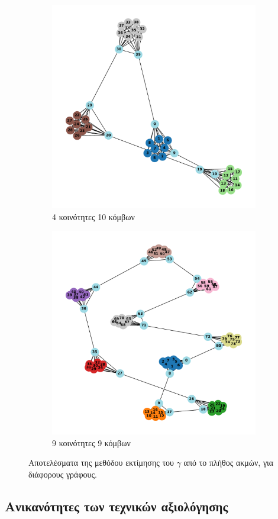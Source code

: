\documentclass[12pt, letterpaper]{article}
\begin{document}
\begin{figure}
  \begin{subfigure}{0.5\textwidth}
    \centering
    \includegraphics[width=0.6\linewidth]{AUTO4,10.pdf}
    \caption{4 κοινότητες 10 κόμβων}
    \label{}
  \end{subfigure}
  \begin{subfigure}{0.5\textwidth}
    \centering
    \includegraphics[width=0.6\linewidth]{AUTO9,9.pdf}
    \caption{9 κοινότητες 9 κόμβων}
    \label{}
  \end{subfigure}


  \caption{Αποτελέσματα της μεθόδου εκτίμησης του $\gamma$
  από το πλήθος ακμών, για διάφορους γράφους.}
  \label{edgeresults}
\end{figure}














\subsection{Ανικανότητες των τεχνικών αξιολόγησης}
\end{document}
